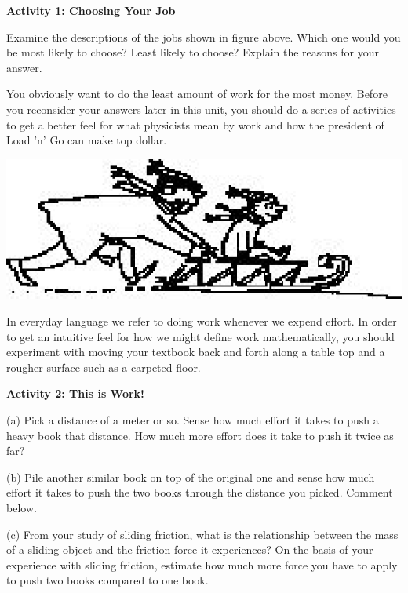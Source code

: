 \textbf{Activity 1: Choosing Your Job }

Examine the descriptions of the jobs shown in figure above. Which one would
you be most likely to choose? Least likely to choose? Explain the reasons for
your answer.
\vspace{30mm}

You obviously want to do the least amount of work for the most money. Before
you reconsider your answers later in this unit, you should do a series of activities
to get a better feel for what physicists mean by work and how the president
of Load 'n' Go can make top dollar.

\vspace{0.3cm}
{\par\centering \includegraphics{work_power/work_power_fig2.eps} \par}
\vspace{0.3cm}

In everyday language we refer to doing work whenever we expend effort. In order
to get an intuitive feel for how we might define work mathematically, you should
experiment with moving your textbook back and forth along a table top and a
rougher surface such as a carpeted floor.

\textbf{Activity 2: This is Work!} 

(a) Pick a distance of a meter or so. Sense how much effort it takes to push
a heavy book that distance. How much more effort does it take to push it twice
as far? 
\vspace{20mm}

(b) Pile another similar book on top of the original one and sense how much
effort it takes to push the two books through the distance you picked. Comment
below.
\vspace{20mm}

(c) From your study of sliding friction, what is the relationship between the
mass of a sliding object and the friction force it experiences? On the basis
of your experience with sliding friction, estimate how much more force you have
to apply to push two books compared to one book.
\vspace{20mm}

